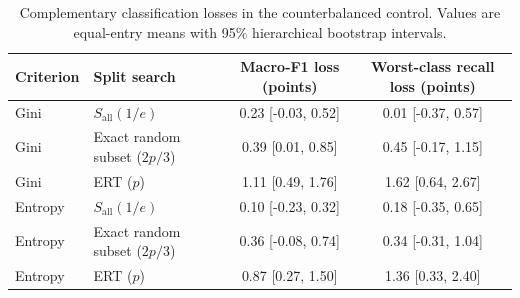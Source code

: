 \begin{table}[t]
\centering
\small
\caption{Complementary classification losses in the counterbalanced control. Values are equal-entry means with 95\% hierarchical bootstrap intervals.}
\label{tab:supp_class_metrics}
\begin{tabular}{llcc}
\toprule
Criterion & Split search & Macro-F1 loss (points) & Worst-class recall loss (points) \\
\midrule
Gini & $S_{\mathrm{all}}(1/e)$ & 0.23 [-0.03, 0.52] & 0.01 [-0.37, 0.57] \\
Gini & Exact random subset ($2p/3$) & 0.39 [0.01, 0.85] & 0.45 [-0.17, 1.15] \\
Gini & ERT ($p$) & 1.11 [0.49, 1.76] & 1.62 [0.64, 2.67] \\
Entropy & $S_{\mathrm{all}}(1/e)$ & 0.10 [-0.23, 0.32] & 0.18 [-0.35, 0.65] \\
Entropy & Exact random subset ($2p/3$) & 0.36 [-0.08, 0.74] & 0.34 [-0.31, 1.04] \\
Entropy & ERT ($p$) & 0.87 [0.27, 1.50] & 1.36 [0.33, 2.40] \\
\bottomrule
\end{tabular}
\end{table}
